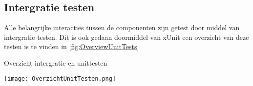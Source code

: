 \subsection{Intergratie testen}
Alle belangrijke interacties tussen de componenten zijn getest door middel van intergratie testen.
Dit is ook gedaan doormiddel van xUnit een overzicht van deze testen is te vinden in \ref{fig:OverviewUnitTests}

\whitespace[2]
\begin{graphic}
	\captionsetup{type=figure}
	\caption{Overzicht intergratie en unittesten}
	\texttt{[image: OverzichtUnitTesten.png]}
	\label{fig:OverviewUnitTests}
\end{graphic}

